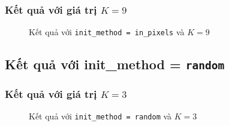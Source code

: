\subsubsection{Kết quả với giá trị $K = 9$}
\begin{figure}[H]
	\centering
	\qquad
	\caption{Kết quả với \texttt{init\_method = in\_pixels} và $K = 9$}%
\end{figure}

\subsection{Kết quả với init\_method = \texttt{random}}

\subsubsection{Kết quả với giá trị $K = 3$}
\begin{figure}[H]
	\centering
	\qquad
	\caption{Kết quả với \texttt{init\_method = random} và $K = 3$}%
\end{figure}

